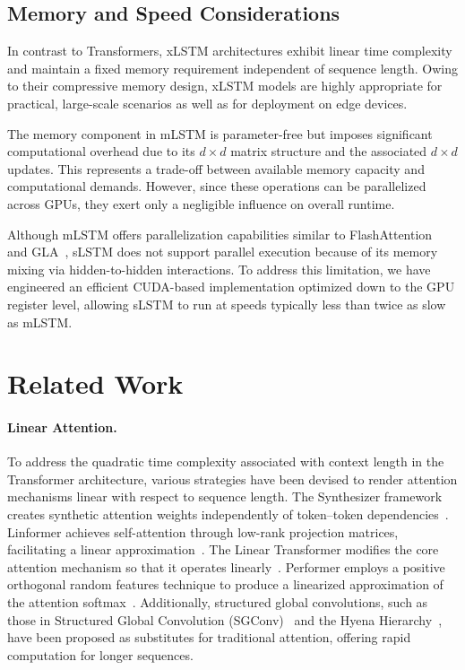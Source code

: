 \subsection{Memory and Speed Considerations}

In contrast to Transformers, xLSTM architectures exhibit linear time complexity and maintain a fixed memory requirement independent of sequence length. Owing to their compressive memory design, xLSTM models are highly appropriate for practical, large-scale scenarios as well as for deployment on edge devices.

The memory component in mLSTM is parameter-free but imposes significant computational overhead due to its $d \times d$ matrix structure and the associated $d \times d$ updates. This represents a trade-off between available memory capacity and computational demands. However, since these operations can be parallelized across GPUs, they exert only a negligible influence on overall runtime.

Although mLSTM offers parallelization capabilities similar to FlashAttention~\citep{Dao:22,Dao:23} and GLA~\citep{Yang:23arxiv}, sLSTM does not support parallel execution because of its memory mixing via hidden-to-hidden interactions. To address this limitation, we have engineered an efficient CUDA-based implementation optimized down to the GPU register level, allowing sLSTM to run at speeds typically less than twice as slow as mLSTM.

\section{Related Work}
\label{sec:related}

\paragraph{Linear Attention.} To address the quadratic time complexity associated with context length in the Transformer architecture, various strategies have been devised to render attention mechanisms linear with respect to sequence length. The Synthesizer framework creates synthetic attention weights independently of token--token dependencies~\citep{Tay:20arxiv}. Linformer achieves self-attention through low-rank projection matrices, facilitating a linear approximation~\citep{Wang:20arxiv}. The Linear Transformer modifies the core attention mechanism so that it operates linearly~\citep{Katharopoulos:20}. Performer employs a positive orthogonal random features technique to produce a linearized approximation of the attention softmax~\citep{Choromanski:21}. Additionally, structured global convolutions, such as those in Structured Global Convolution (SGConv)~\citep{Li:22} and the Hyena Hierarchy~\citep{Poli:23}, have been proposed as substitutes for traditional attention, offering rapid computation for longer sequences.

